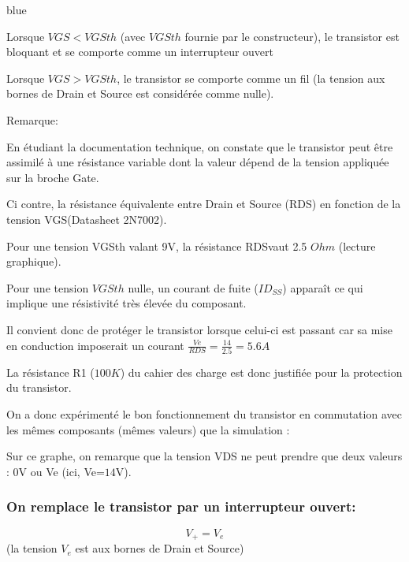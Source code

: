 \begin{items}{blue}{\Bullet}
\item Lorsque $VGS<VGSth$ (avec $VGSth$ fournie par le constructeur), le transistor est bloquant et se comporte comme un interrupteur ouvert
\item Lorsque $VGS>VGSth$, le transistor se comporte comme un fil (la tension aux bornes de Drain et Source est considérée comme nulle).
\end{items}{

Remarque:

En étudiant la documentation technique, on constate que le transistor peut être assimilé à une résistance variable dont la valeur dépend de la tension appliquée sur la broche Gate.

Ci contre, la résistance équivalente entre Drain et Source (RDS) en fonction de la tension VGS(Datasheet 2N7002).


Pour une tension VGSth valant 9V, la résistance RDSvaut 2.5 $Ohm $ (lecture graphique).

Pour une tension $VGSth$ nulle, un courant de fuite ($ID_{SS}$) apparaît ce qui implique une résistivité très élevée du composant.


Il convient donc de protéger le transistor lorsque celui-ci est passant car sa mise en conduction imposerait un courant $\frac{Ve}{RDS} = \frac{14}{2.5} =5.6A$

La résistance R1 ($100K$) du cahier des charge est donc justifiée pour la protection du transistor.


On a donc expérimenté le bon fonctionnement du transistor en commutation avec les mêmes composants (mêmes valeurs) que la simulation :


Sur ce graphe, on remarque que la tension VDS ne peut prendre que deux valeurs : 0V ou Ve (ici, Ve=$14$V).


\subsubsection{On remplace le transistor par un interrupteur ouvert:}


$$V_+=V_e$$ (la tension $V_e$ est aux bornes de Drain et Source)

}
